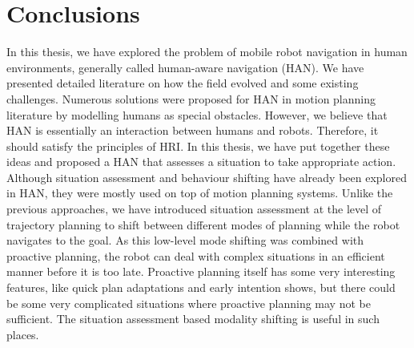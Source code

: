 \chapter{Conclusions}



In this thesis, we have explored the problem of mobile robot navigation in human environments, generally called human-aware navigation (HAN). We have presented detailed literature on how the field evolved and some existing challenges. Numerous solutions were proposed for HAN in motion planning literature by modelling humans as special obstacles. However, we believe that HAN is essentially an interaction between humans and robots. Therefore, it should satisfy the principles of HRI. In this thesis, we have put together these ideas and proposed a HAN that assesses a situation to take appropriate action. Although situation assessment and behaviour shifting have already been explored in HAN, they were mostly used on top of motion planning systems. Unlike the previous approaches, we have introduced situation assessment at the level of trajectory planning to shift between different modes of planning while the robot navigates to the goal. As this low-level mode shifting was combined with proactive planning, the robot can deal with complex situations in an efficient manner before it is too late. Proactive planning itself has some very interesting features, like quick plan adaptations and early intention shows, but there could be some very complicated situations where proactive planning may not be sufficient. The situation assessment based modality shifting is useful in such places.

